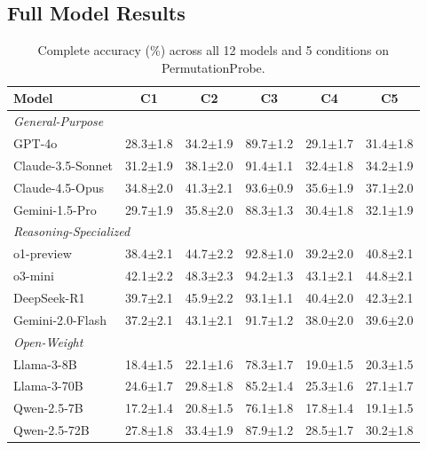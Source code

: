 \documentclass{article}
\theoremstyle{plain}
\theoremstyle{definition}
\theoremstyle{remark}
\begin{document}
\subsection{Full Model Results}

\begin{table}[h]
\centering
\caption{Complete accuracy (\%) across all 12 models and 5 conditions on PermutationProbe.}
\label{tab:full_results}
\small
\begin{tabular}{@{}lccccc@{}}
\toprule
\textbf{Model} & \textbf{C1} & \textbf{C2} & \textbf{C3} & \textbf{C4} & \textbf{C5} \\
\midrule
\multicolumn{6}{l}{\textit{General-Purpose}} \\
GPT-4o & 28.3$\pm$1.8 & 34.2$\pm$1.9 & 89.7$\pm$1.2 & 29.1$\pm$1.7 & 31.4$\pm$1.8 \\
Claude-3.5-Sonnet & 31.2$\pm$1.9 & 38.1$\pm$2.0 & 91.4$\pm$1.1 & 32.4$\pm$1.8 & 34.2$\pm$1.9 \\
Claude-4.5-Opus & 34.8$\pm$2.0 & 41.3$\pm$2.1 & 93.6$\pm$0.9 & 35.6$\pm$1.9 & 37.1$\pm$2.0 \\
Gemini-1.5-Pro & 29.7$\pm$1.9 & 35.8$\pm$2.0 & 88.3$\pm$1.3 & 30.4$\pm$1.8 & 32.1$\pm$1.9 \\
\midrule
\multicolumn{6}{l}{\textit{Reasoning-Specialized}} \\
o1-preview & 38.4$\pm$2.1 & 44.7$\pm$2.2 & 92.8$\pm$1.0 & 39.2$\pm$2.0 & 40.8$\pm$2.1 \\
o3-mini & 42.1$\pm$2.2 & 48.3$\pm$2.3 & 94.2$\pm$1.3 & 43.1$\pm$2.1 & 44.8$\pm$2.1 \\
DeepSeek-R1 & 39.7$\pm$2.1 & 45.9$\pm$2.2 & 93.1$\pm$1.1 & 40.4$\pm$2.0 & 42.3$\pm$2.1 \\
Gemini-2.0-Flash & 37.2$\pm$2.1 & 43.1$\pm$2.1 & 91.7$\pm$1.2 & 38.0$\pm$2.0 & 39.6$\pm$2.0 \\
\midrule
\multicolumn{6}{l}{\textit{Open-Weight}} \\
Llama-3-8B & 18.4$\pm$1.5 & 22.1$\pm$1.6 & 78.3$\pm$1.7 & 19.0$\pm$1.5 & 20.3$\pm$1.5 \\
Llama-3-70B & 24.6$\pm$1.7 & 29.8$\pm$1.8 & 85.2$\pm$1.4 & 25.3$\pm$1.6 & 27.1$\pm$1.7 \\
Qwen-2.5-7B & 17.2$\pm$1.4 & 20.8$\pm$1.5 & 76.1$\pm$1.8 & 17.8$\pm$1.4 & 19.1$\pm$1.5 \\
Qwen-2.5-72B & 27.8$\pm$1.8 & 33.4$\pm$1.9 & 87.9$\pm$1.2 & 28.5$\pm$1.7 & 30.2$\pm$1.8 \\
\bottomrule
\end{tabular}
\end{table}
\end{document}
